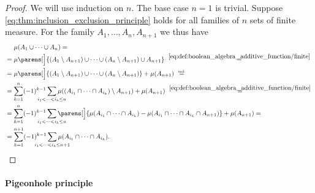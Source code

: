 \begin{proof}
  We will use induction on \( n \). The base case \( n = 1 \) is trivial. Suppose \eqref{eq:thm:inclusion_exclusion_principle} holds for all families of \( n \) sets of finite measure. For the family \( A_1, \ldots, A_n, A_{n+1} \) we thus have
  \begin{align*}
    &\phantom{{}={}}
    \mu(A_1 \cup \cdots \cup A_n)
    = \\ &=
    \mu\parens[\Big]{ (A_1 \setminus A_{n+1}) \cup \cdots \cup (A_n \setminus A_{n+1}) \cup A_{n+1} }
    \reloset {\eqref{eq:def:boolean_algebra_additive_function/finite}} = \\ &=
    \mu\parens[\Big]{ (A_1 \setminus A_{n+1}) \cup \cdots \cup (A_n \setminus A_{n+1}) } + \mu(A_{n+1})
    \reloset {\T{ind.}} = \\ &=
    \sum_{k=1}^n (-1)^{k - 1} \sum_{\mathclap{i_1 < \cdots < i_k \leq n}} \mu( (A_{i_1} \cap \cdots \cap A_{i_k}) \setminus A_{n+1}) + \mu(A_{n+1})
    \reloset {\eqref{eq:def:boolean_algebra_additive_function/finite}} = \\ &=
    \sum_{k=1}^n (-1)^{k - 1} \sum_{\mathclap{i_1 < \cdots < i_k \leq n}} \parens[\Big]{ \mu(A_{i_1} \cap \cdots \cap A_{i_k}) - \mu(A_{i_1} \cap \cdots \cap A_{i_k} \cap A_{n+1}) } + \mu(A_{n+1})
    = \\ &=
    \sum_{k=1}^{n + 1} (-1)^{k - 1} \sum_{\mathclap{i_1 < \cdots < i_k \leq n + 1}} \mu(A_{i_1} \cap \cdots \cap A_{i_k}).
  \end{align*}
\end{proof}

\paragraph{Pigeonhole principle}

